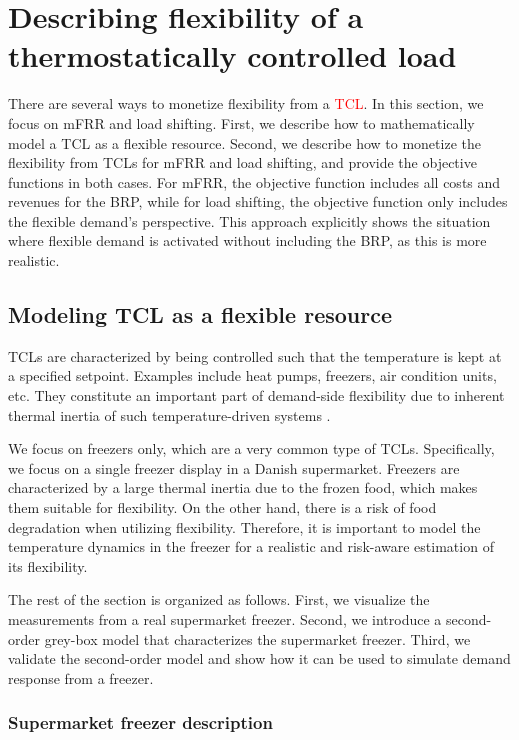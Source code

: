 \documentclass[11pt,a4paper]{article}
\begin{document}
\section{Describing flexibility of a thermostatically controlled load}\label{sec:monetizing_flex}

There are several ways to monetize flexibility from a \textcolor{red}{TCL}. In this section, we focus on mFRR and load shifting. First, we describe how to mathematically model a TCL as a flexible resource. Second, we describe how to monetize the flexibility from TCLs for mFRR and load shifting, and provide the objective functions in both cases. For mFRR, the objective function includes all costs and revenues for the BRP, while for load shifting, the objective function only includes the flexible demand's perspective. This approach explicitly shows the situation where flexible demand is activated without including the BRP, as this is more realistic.

\subsection{Modeling TCL as a flexible resource}
%
TCLs are characterized by being controlled such that the temperature is kept at a specified setpoint. Examples include heat pumps, freezers, air condition units, etc. They constitute an important part of demand-side flexibility due to  inherent thermal inertia of such temperature-driven systems \cite{hao2014aggregate}.

We focus on freezers only, which are a very common type of TCLs. Specifically, we focus on a single freezer display in a Danish supermarket. Freezers are characterized by a large thermal inertia due to the frozen food, which makes them suitable for flexibility. On the other hand, there is a risk of food degradation when utilizing flexibility. Therefore, it is important to model the temperature dynamics in the freezer for a realistic and risk-aware estimation of its flexibility.

The rest of the section is organized as follows. First, we visualize the measurements from a real supermarket freezer. Second, we introduce a second-order grey-box model that characterizes the supermarket freezer. Third, we validate the second-order model and show how it can be used to simulate demand response from a freezer.

\subsubsection{Supermarket freezer description}
\end{document}
